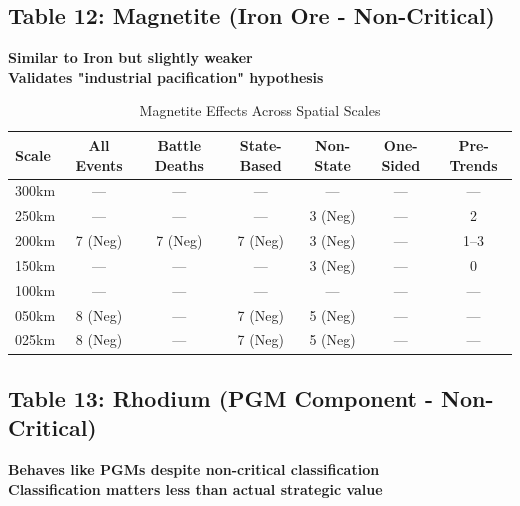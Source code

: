 \documentclass[11pt]{article}
\begin{document}
\subsection{Table 12: Magnetite (Iron Ore - Non-Critical)}

\textbf{Similar to Iron but slightly weaker}\\
\textbf{Validates "industrial pacification" hypothesis}

\begin{table}[H]
\centering
\caption{Magnetite Effects Across Spatial Scales}
\begin{tabular}{lcccccc}
\toprule
Scale & All Events & Battle Deaths & State-Based & Non-State & One-Sided & Pre-Trends \\
\midrule
300km & ---       & ---           & ---         & ---       & ---       & ---        \\
250km & ---       & ---           & ---         & 3 (Neg)   & ---       & 2          \\
200km & 7 (Neg)   & 7 (Neg)       & 7 (Neg)     & 3 (Neg)   & ---       & 1--3       \\
150km & ---       & ---           & ---         & 3 (Neg)   & ---       & 0          \\
100km & ---       & ---           & ---         & ---       & ---       & ---        \\
050km & 8 (Neg)   & ---           & 7 (Neg)     & 5 (Neg)   & ---       & ---        \\
025km & 8 (Neg)   & ---           & 7 (Neg)     & 5 (Neg)   & ---       & ---        \\
\bottomrule
\end{tabular}
\end{table}

\clearpage

\subsection{Table 13: Rhodium (PGM Component - Non-Critical)}

\textbf{Behaves like PGMs despite non-critical classification}\\
\textbf{Classification matters less than actual strategic value}
\end{document}
